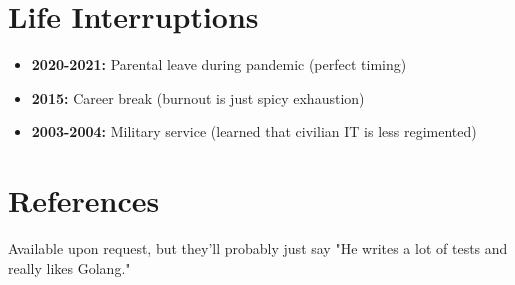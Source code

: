 \documentclass[11pt,a4paper]{article}
\begin{document}
\section*{Life Interruptions}

\begin{itemize}
\item \textbf{2020-2021:} Parental leave during pandemic (perfect timing)
\item \textbf{2015:} Career break (burnout is just spicy exhaustion)
\item \textbf{2003-2004:} Military service (learned that civilian IT is less regimented)
\end{itemize}

\section*{References}

Available upon request, but they'll probably just say "He writes a lot of tests and really likes Golang."
\end{document}
